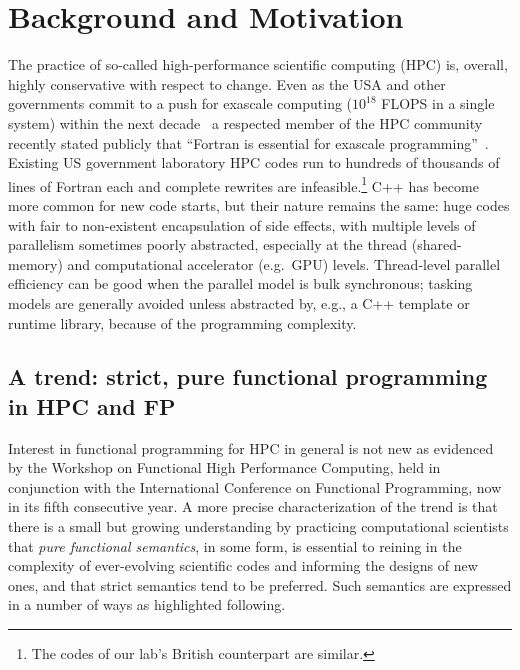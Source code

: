 \documentclass{llncs}
\begin{document}
\section{Background and Motivation}
The practice of so-called high-performance scientific computing (HPC) is,
overall, highly conservative with respect to change.  Even as the USA and
other governments commit to a push for exascale computing ($10^{18}$ FLOPS in
a single system) within the next
decade~\cite{Exascale-roadmap,EUexascale,Exascale-org} a respected
member of the HPC community recently stated publicly that ``Fortran is
essential for exascale programming''~\cite{Heroux16}.  Existing US government
laboratory HPC codes run to hundreds of thousands of lines of Fortran each and
complete rewrites are infeasible.\footnote{The codes of our lab's British
  counterpart are similar.}  C++ has become more common for new code starts,
but their nature remains the same: huge codes with fair to non-existent
encapsulation of side effects, with multiple levels of parallelism sometimes
poorly abstracted, especially at the thread (shared-memory) and computational
accelerator (e.g.\ GPU) levels.  Thread-level parallel efficiency can be good
when the parallel model is bulk synchronous; tasking models are generally
avoided unless abstracted by, e.g., a C++ template or runtime library, because
of the programming complexity.

\subsection{A trend: strict, pure functional programming in HPC and FP}
Interest in functional programming for HPC in general is not new as evidenced
by the Workshop on Functional High Performance Computing, held in conjunction
with the International Conference on Functional Programming, now in its fifth
consecutive year.  A more precise characterization of the trend is that there
is a small but growing understanding by practicing computational scientists
that \emph{pure functional semantics}, in some form, is essential to reining
in the complexity of ever-evolving scientific codes and informing the designs
of new ones, and that strict semantics tend to be preferred.  Such semantics
are expressed in a number of ways as highlighted following.
\end{document}
